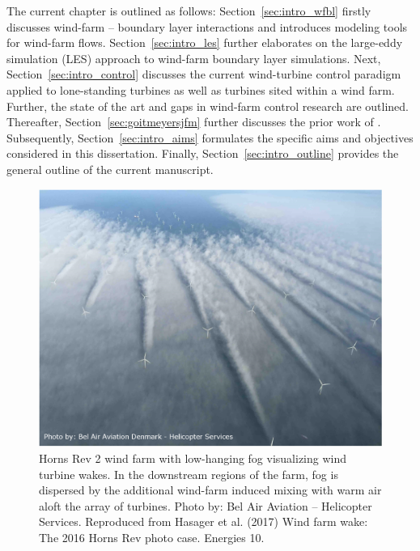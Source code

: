 The current chapter is outlined as follows: Section~\ref{sec:intro_wfbl} firstly discusses wind-farm -- boundary layer interactions and introduces modeling tools for wind-farm flows. Section~\ref{sec:intro_les} further elaborates on the large-eddy simulation (LES) approach to wind-farm boundary layer simulations. Next, Section~\ref{sec:intro_control} discusses the current wind-turbine control paradigm applied to lone-standing turbines as well as turbines sited within a wind farm. Further, the state of the art and gaps in wind-farm control research are outlined. Thereafter, Section~\ref{sec:goitmeyersjfm} further discusses the prior work of \cite{goit2015optimal}. Subsequently, Section~\ref{sec:intro_aims} formulates the specific aims and objectives considered in this dissertation. Finally, Section~\ref{sec:intro_outline} provides the general outline of the current manuscript.

\begin{figure}[t]
	\centering
	\includegraphics[width=\textwidth]{chapters/introduction/HR2.eps}
	\caption[Horns Rev 2 wind farm with low-hanging fog visualizing wind turbine wakes.]{Horns Rev 2 wind farm with low-hanging fog visualizing wind turbine wakes. In the downstream regions of the farm, fog is dispersed by the additional wind-farm induced mixing with warm air aloft the array of turbines. Photo by: Bel Air Aviation -- Helicopter Services. Reproduced from Hasager et al. (2017) Wind farm wake: The 2016 Horns Rev photo case. Energies 10. \label{fig:horns_rev}}
\end{figure}


